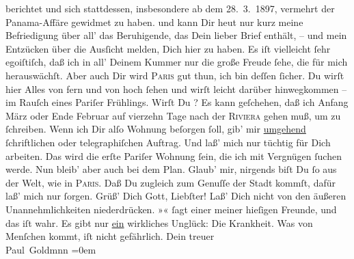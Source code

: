 \begin{ledgroupsized}[t]{13cm}
{{{                  berichtet und sich stattdessen, insbesondere ab dem 28. 3. 1897, vermehrt der Panama-Affäre gewidmet zu haben.}}}\label{K_L02803-1h} und kann Dir heut nur kurz meine Befriedigung über all’ das Beruhigende, das Dein
               lieber Brief enthält, – und mein Entzücken über die Ausſicht melden, Dich hier zu
               haben. Es iſt vielleicht ſehr egoiſtiſch, daß ich in all’ Deinem Kummer nur die große
               Freude ſehe, die für mich herauswächſt. Aber auch Dir wird \textsc{Paris} gut thun, ich bin deſſen ſicher. {\pb}Du wirſt
               hier Alles von fern und von hoch ſehen und wirſt leicht darüber hinwegkommen – im
               Rauſch eines Pariſer Frühlings.\pend
           \pstart
           Wirſt Du \label{K_L02803-2v}\label{K_L02803-2h}? Es kann geſchehen, daß ich
               Anfang März oder Ende Februar
               auf vierzehn Tage nach der \textsc{Riviera} gehen muß, um \label{K_L02803-3v}\label{K_L02803-3h} zu ſchreiben. Wenn ich Dir alſo Wohnung beſorgen ſoll, gib’ mir \uline{umgehend} ſchriftlichen oder telegraphiſchen Auftrag.
               Und laß’ mich nur tüchtig für Dich arbeiten. {\pb}Das
               wird die erſte Pariſer Wohnung ſein, die ich mit
               Vergnügen ſuchen werde.\pend
           \pstart
           Nun bleib’ aber auch bei dem Plan. Glaub’ mir, nirgends biſt Du ſo aus der Welt, wie
               in \textsc{Paris}. Daß Du zugleich zum Genuſſe der Stadt kommſt, dafür laß’ mich nur  ſorgen.\pend
           \pstart
           Grüß’ Dich Gott, Liebſter! Laß’ Dich nicht von den äußeren Unannehmlichkeiten
               niederdrücken. »\label{K_L02803-4v}\label{K_L02803-4h}« ſagt einer meiner hieſigen Freunde, und das iſt wahr. {\pb}Es gibt nur \uline{ein}
               wirkliches Unglück: Die Krankheit. Was von Menſchen kommt, iſt nicht gefährlich.\pend
           \pstart
           Dein treuer {\\[\baselineskip]}\spacefill\mbox{Paul Goldmnn}\pend
           \leftskip=0em{}
         
         \endnumbering{}\end{ledgroupsized}  \newcommand{\dateiname}{L02803}\newcommand{\titel}{Paul Goldmann an Arthur Schnitzler, 16. 2. [1897]}\newcommand{\editorInnen}{Martin Anton Müller und Laura Untner}
      
